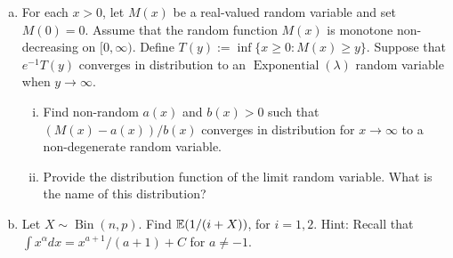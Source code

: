 \begin{exercise}

\begin{enumerate}[(a)]

\item For each \(x > 0\), let \(M(x)\) be a real-valued random variable and set \(M(0)= 0\). Assume that the random function \(M(x)\) is monotone non-decreasing on \([0, \infty)\). Define \(T(y) := \inf \{x \geq 0: M(x) \geq y\}\). Suppose that \(e^{-1} T(y) \) converges in distribution to an \(\operatorname{Exponential}(\lambda)\) random variable when \(y \to \infty\). 

\begin{enumerate}[(i)]

\item Find non-random \(a(x)\) and \(b(x) >0\) such that \((M(x) - a(x))/b(x)\) converges in distribution for \(x \to \infty\) to a non-degenerate random variable.

\item Provide the distribution function of the limit random variable. What is the name of this distribution?

\end{enumerate}

\item Let \(X \sim \operatorname{Bin}(n, p)\). Find \(\mathbb{E}(1/(i+X))\), for \(i = 1, 2\). Hint: Recall that \(\int x^\alpha dx = x^{a + 1}/(a+1) + C\) for \(a \neq -1\).

\end{enumerate}

\end{exercise}

